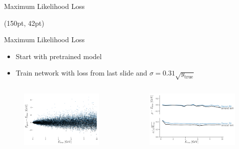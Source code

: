 \documentclass[10pt]{beamer}
\begin{document}
\begin{frame}{Maximum Likelihood Loss}
    \begin{textblock*}{300pt}(150pt, 42pt)
      
    \end{textblock*}
\end{frame}

\begin{frame}{Maximum Likelihood Loss}
  \begin{itemize}
  \item Start with pretrained model
  \item Train network with loss from last slide and $\sigma = 0.31 \sqrt{y_{\text{true}}}$
  \end{itemize}
  \begin{columns}
    \begin{figure}[htp]
      \includegraphics[width=1.1\textwidth]{../images/likelihood.png}
    \end{figure}
    \begin{figure}[htp]
      \includegraphics[width=1.1\textwidth]{../images/likelihood_res.png}
    \end{figure}
  \end{columns}


\end{frame}
\end{document}
